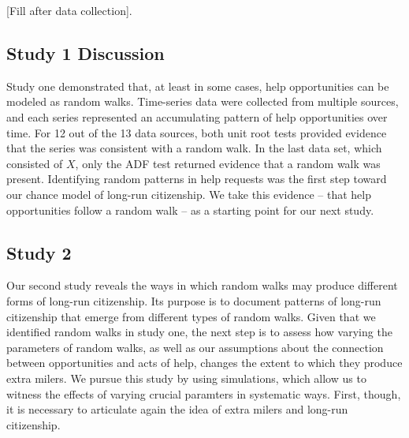 \documentclass[english,,man]{apa6}
\theoremstyle{definition}
\theoremstyle{definition}
\theoremstyle{definition}
\theoremstyle{remark}
\begin{document}
{[}Fill after data collection{]}.

\hypertarget{study-1-discussion}{%
\subsection{Study 1 Discussion}\label{study-1-discussion}}

Study one demonstrated that, at least in some cases, help opportunities
can be modeled as random walks. Time-series data were collected from
multiple sources, and each series represented an accumulating pattern of
help opportunities over time. For 12 out of the 13 data sources, both
unit root tests provided evidence that the series was consistent with a
random walk. In the last data set, which consisted of \(X\), only the
ADF test returned evidence that a random walk was present. Identifying
random patterns in help requests was the first step toward our chance
model of long-run citizenship. We take this evidence -- that help
opportunities follow a random walk -- as a starting point for our next
study.

\hypertarget{study-2}{%
\subsection{Study 2}\label{study-2}}

Our second study reveals the ways in which random walks may produce
different forms of long-run citizenship. Its purpose is to document
patterns of long-run citizenship that emerge from different types of
random walks. Given that we identified random walks in study one, the
next step is to assess how varying the parameters of random walks, as
well as our assumptions about the connection between opportunities and
acts of help, changes the extent to which they produce extra milers. We
pursue this study by using simulations, which allow us to witness the
effects of varying crucial paramters in systematic ways. First, though,
it is necessary to articulate again the idea of extra milers and
long-run citizenship.
\end{document}
